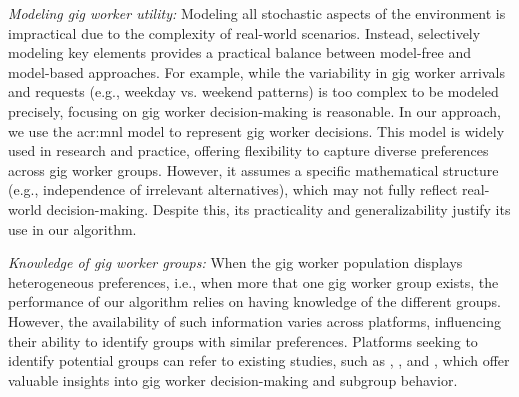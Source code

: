 \noindent \textit{Modeling gig worker utility:} Modeling all stochastic aspects of the environment is impractical due to the complexity of real-world scenarios. Instead, selectively modeling key elements provides a practical balance between model-free and model-based approaches. For example, while the variability in gig worker arrivals and requests (e.g., weekday vs. weekend patterns) is too complex to be modeled precisely, focusing on gig worker decision-making is reasonable. In our approach, we use the \gls{acr:mnl} model to represent gig worker decisions. This model is widely used in research and practice, offering flexibility to capture diverse preferences across gig worker groups. However, it assumes a specific mathematical structure (e.g., independence of irrelevant alternatives), which may not fully reflect real-world decision-making. Despite this, its practicality and generalizability justify its use in our algorithm.

\noindent \textit{Knowledge of gig worker groups:} When the gig worker population displays heterogeneous preferences, i.e., when more that one gig worker group exists, the performance of our algorithm relies on having knowledge of the different groups. However, the availability of such information varies across platforms, influencing their ability to identify groups with similar preferences. Platforms seeking to identify potential groups can refer to existing studies, such as \cite{marcucci2017connected}, \cite{bathke2023occasional}, and \cite{miller2017crowdsourced}, which offer valuable insights into gig worker decision-making and subgroup behavior.
